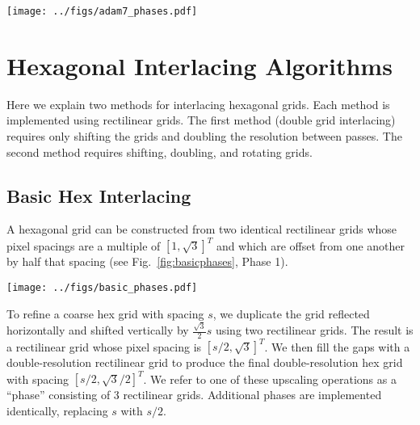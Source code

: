 \documentclass[aip, amsmath, amssymb, nobibnotes, nofootinbib, citeautoscript, reprint, superscriptaddress]{revtex4-1}
\begin{document}
    \begin{figure*}
        \centering
        \texttt{[image: ../figs/adam7\_phases.pdf]}
        \caption{\label{fig:adam7phases}
        The Adam7 interlacing method for rectilinear grids.
            Starting from an initial grid (Phase 1), each subsequent phase consists of doubling the columns (blue) then rows (green) of the grid.
            }
    \end{figure*}


    \section{Hexagonal Interlacing Algorithms}
    \label{sec:hexinter}

    Here we explain two methods for interlacing hexagonal grids.
    Each method is implemented using rectilinear grids.
    The first method (double grid interlacing) requires only shifting the grids and doubling the resolution between passes.
    The second method requires shifting, doubling, and rotating grids.


    \subsection{Basic Hex Interlacing}
    \label{double-grid-interlacing}

    A hexagonal grid can be constructed from two identical rectilinear grids
    whose pixel spacings are a multiple of $[1, \sqrt{3}]^T$ and which are offset from one another by half that spacing (see Fig.~\ref{fig:basicphases}, Phase 1).

    \begin{figure*}
        \centering
        \texttt{[image: ../figs/basic\_phases.pdf]}
        \caption{
        \label{fig:basicphases} Refining a hex grid through multiple interlacing passes.
        In each pass, previously sampled points are shown in gray.
        Each pass consists of multiple rectilinear scans with aspect ratio $\sqrt{3}$.
        }
    \end{figure*}

    To refine a coarse hex grid with spacing $s$, we duplicate the grid reflected horizontally and shifted vertically by $\frac{\sqrt{3}}{2} s$ using two rectilinear grids.
    The result is a rectilinear grid whose pixel spacing is $[s/2, \sqrt{3}]^T$.
    We then fill the gaps with a double-resolution rectilinear grid to produce the final double-resolution hex grid with spacing $[s/2, \sqrt{3}/2]^T$.
    We refer to one of these upscaling operations as a ``phase'' consisting of 3 rectilinear grids.
    Additional phases are implemented identically, replacing $s$ with $s/2$.
\end{document}
